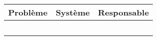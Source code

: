 \begin{tabularx}{\linewidth}{
    |>{\hsize=2.0\hsize}X|%
    >{\hsize=0.5\hsize}X|%
    >{\hsize=0.5\hsize}X|%
  }
    \hline
    Problème & Système & Responsable \\\hline
      &   &   \\\hline
      &   &   \\\hline
      &   &   \\\hline
      &   &   \\\hline
      &   &   \\\hline
  \end{tabularx}
     